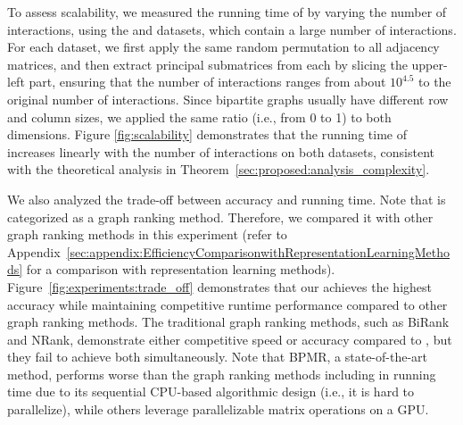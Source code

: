 To assess scalability, we measured the running time of \method by varying the number of interactions, using the \taobao and \tenrec datasets, which contain a large number of interactions. 
For each dataset, we first apply the same random permutation to all adjacency matrices, and then extract principal submatrices from each by slicing the upper-left part, ensuring that the number of interactions ranges from about $10^{4.5}$ to the original number of interactions.
Since bipartite graphs usually have different row and column sizes, we applied the same ratio (i.e., from 0 to 1) to both dimensions.
Figure \ref{fig:scalability} demonstrates that the running time of \method increases linearly with the number of interactions on both datasets, consistent with the theoretical analysis in Theorem~\ref{sec:proposed:analysis_complexity}.

%
We also analyzed the trade-off between accuracy and running time. 
Note that \method is categorized as a graph ranking method. 
Therefore, we compared it with other graph ranking methods in this experiment (refer to Appendix~\ref{sec:appendix:EfficiencyComparisonwithRepresentationLearningMethods} for a comparison with representation learning methods).
%
Figure~\ref{fig:experiments:trade_off} demonstrates that our \method achieves the highest accuracy while maintaining competitive runtime performance compared to other graph ranking methods.
The traditional graph ranking methods, such as BiRank and NRank, demonstrate either competitive speed or accuracy compared to \method, but they fail to achieve both simultaneously.
Note that BPMR, a state-of-the-art method, performs worse than the graph ranking methods including \method in running time due to its sequential CPU-based algorithmic design (i.e., it is hard to parallelize), while others leverage parallelizable matrix operations on a GPU.
